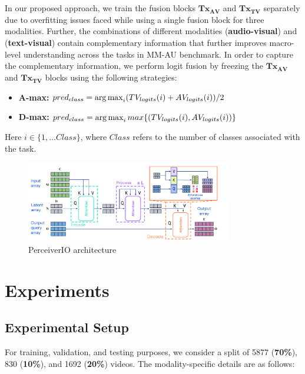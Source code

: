 In our proposed approach, we train the fusion blocks $\mathbf{{Tx}_{AV}}$ and $\mathbf{{Tx}_{TV}}$ separately due to overfitting issues faced while using a single fusion block for three modalities. Further, the combinations of different modalities (\textbf{audio-visual}) and (\textbf{text-visual}) contain complementary information that further improves macro-level understanding across the tasks in MM-AU benchmark. In order to capture the complementary information, we perform logit fusion by freezing the $\mathbf{{Tx}_{AV}}$ and $\mathbf{{Tx}_{TV}}$ blocks using the following strategies:

\begin{itemize}
    \item \textbf{A-max:} $pred_{class}=\operatorname*{arg\,max}_i (TV_{logits}(i)+AV_{logits}(i))/2$
    \item \textbf{D-max:} $pred_{class}=\operatorname*{arg\,max}_i max\{(TV_{logits}(i),AV_{logits}(i))\}$
\end{itemize}
Here $i \in \{1,...Class\}$, where $Class$ refers to the number of classes associated with the task.

 \begin{figure}
 \centering
    \includegraphics[width=0.8\textwidth]{figures/perceiver_architecture.png}
    \caption{PerceiverIO architecture \cite{Jaegle2021PerceiverIA}}
    \label{Perceiver}
 \end{figure}

\section{Experiments}
\subsection{Experimental Setup}
For training, validation, and testing purposes, we consider a split of 5877 (\textbf{70\%}), 830 (\textbf{10\%}), and 1692 (\textbf{20\%}) videos. The modality-specific details are as follows:

